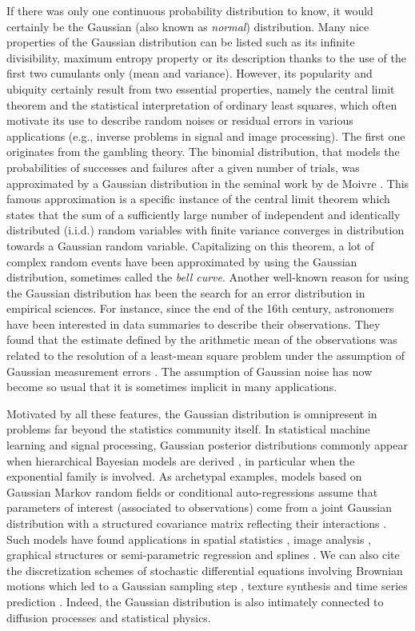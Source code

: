\documentclass[nohypdvips,onefignum,onetabnum]{siamart171218}
\begin{document}
If there was only one continuous probability distribution to know, it would certainly be the Gaussian (also known as \textit{normal}) distribution.
Many nice properties of the Gaussian distribution can be listed such as its infinite divisibility, maximum entropy property or its  description thanks to the use of the first two cumulants only (mean and variance).
%
However, its popularity and ubiquity certainly result from two essential properties, namely the central limit theorem and the statistical interpretation of ordinary least squares, which often motivate its use to describe random noises or residual errors in various applications (e.g., inverse problems in signal and image processing).
%
The first one originates from the gambling theory.
The binomial distribution, that models the probabilities of successes and failures after a given number of trials, was approximated by a Gaussian distribution in the seminal work by de Moivre \cite{Moivre1718}.
This famous approximation is a specific instance of the central limit theorem which states that the sum of a sufficiently large number of independent and identically distributed (i.i.d.) random variables with finite variance converges in distribution towards a Gaussian random variable.
Capitalizing on this theorem, a lot of complex random events have been approximated by using the Gaussian distribution, sometimes called the \emph{bell curve}.
%
Another well-known reason for using the Gaussian distribution has been the search for an error distribution in empirical sciences.
For instance, since the end of the 16th century, astronomers have been interested in data summaries to describe their observations.
They found that the estimate defined by the arithmetic mean of the observations was related to the resolution of a least-mean square problem under the assumption of Gaussian measurement errors \cite{Havil2003}. The assumption of Gaussian noise has now become so usual that it is sometimes implicit in many applications.

Motivated by all these features, the Gaussian distribution is omnipresent in problems far beyond the statistics community itself.
In statistical machine learning and signal processing, Gaussian posterior distributions commonly appear when  hierarchical Bayesian models are derived \cite{Park2008,Polson2013,Gilavert2015,Marnissi2018}, in particular when the exponential family is involved.
As archetypal examples, models based on Gaussian Markov random fields or conditional auto-regressions assume that parameters of interest (associated to observations) come from a joint Gaussian distribution with a structured covariance matrix reflecting their interactions \cite{Rue2005}.
Such models have found applications in spatial statistics \cite{Cressie1993,Besag1995}, image analysis \cite{Geman1984,Kittler1984}, graphical structures \cite{Giudici1999} or semi-parametric regression and splines \cite{Fahrmeir2001}.
We can also cite the discretization schemes of stochastic differential equations involving Brownian motions which led to a Gaussian sampling step \cite{Duane1987,Roberts1996,Welling2011}, texture synthesis \cite{Galerne2011} and time series prediction \cite{Brahim2004}. Indeed, the Gaussian distribution is also intimately connected to diffusion processes and statistical physics.
\end{document}
